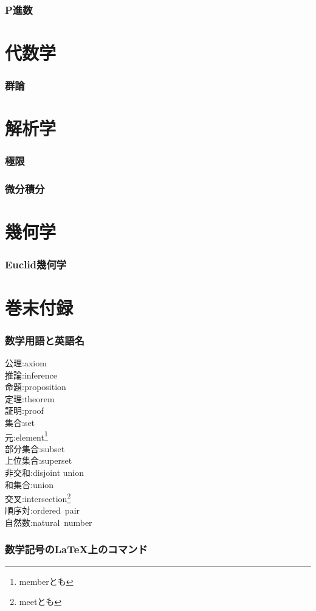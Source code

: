 \documentclass[hyperref,a4paper,12pt]{kininaruki}
\begin{document}
\section{P進数}
\newpage
\part{代数学}
\newpage
\section{群論}
\newpage
\part{解析学}
\section{極限}
\newpage
\section{微分積分}
\newpage
\part{幾何学}
\section{Euclid幾何学}
\part{巻末付録}
\section{数学用語と英語名}
\begin{multicols*}{3}
\noindent
\hypertarget{axiom}{公理}:axiom\\
\hypertarget{inference}{推論}:inference\\
\hypertarget{proposition}{命題}:proposition\\
\hypertarget{theorem}{定理}:theorem\\
\hypertarget{proof}{証明}:proof\\
\hypertarget{set}{集合}:set\\
\hypertarget{member}{元}:element\footnote{memberとも}\\
\hypertarget{subset}{部分集合}:subset\\
\hypertarget{superset}{上位集合}:superset\\
\hypertarget{dunion}{非交和}:disjoint union\\
\hypertarget{union}{和集合}:union\\
\hypertarget{intersection}{交叉}:intersection\footnote{meetとも}\\
\hypertarget{ordpair}{順序対}:ordered\, pair\\
\hypertarget{natural}{自然数}:natural\, number\\
\end{multicols*}
\newpage
\section{数学記号のLaTeX上のコマンド}
\newpage
{} {}
\printindex
\end{document}
